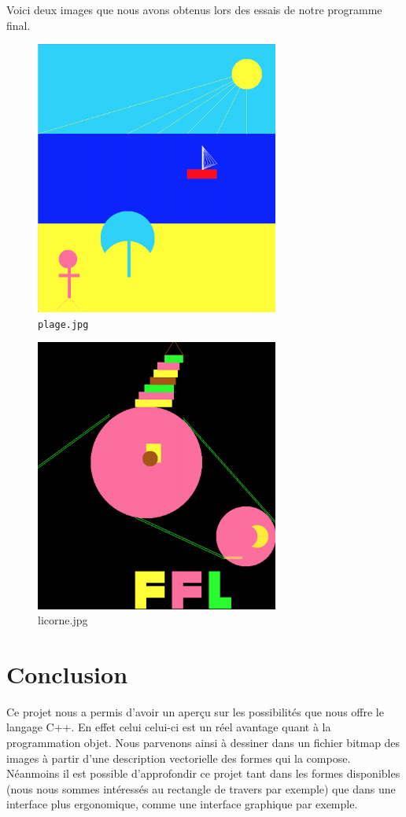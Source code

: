 \documentclass[11pt]{article}
\begin{document}
Voici deux images que nous avons obtenus lors des essais de notre programme final. 

\begin{figure}[!htbp]
    \begin{center}
        \includegraphics[width = 8cm]{plage.jpg}
        \caption{\texttt{plage.jpg}}
    \end{center}
\end{figure}

\begin{figure}[!htbp]
    \begin{center}
        \includegraphics[width = 8cm]{licorne.jpg}
        \caption{licorne.jpg}
    \end{center}
\end{figure}

\clearpage

\section{Conclusion}

Ce projet nous a permis d'avoir un aperçu sur les possibilités que nous offre le langage C++. En effet celui celui-ci est un réel avantage quant à la programmation objet. Nous parvenons ainsi à dessiner dans un fichier bitmap des images à partir d'une description vectorielle des formes qui la compose. Néanmoins il est possible d'approfondir ce projet tant dans les formes disponibles (nous nous sommes intéressés au rectangle de travers par exemple) que dans une interface plus ergonomique, comme une interface graphique par exemple.
\end{document}
